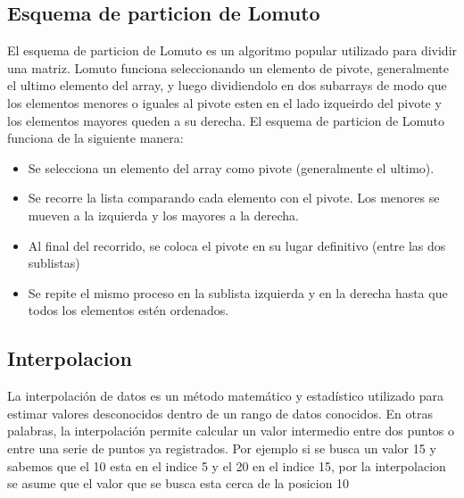 \documentclass[9pt,letterpaper,onecolumn]{rho-class/rho}
\begin{document}
    \subsection{Esquema de particion de Lomuto} \label{ssec:lomuto}
    El esquema de particion de Lomuto es un algoritmo popular utilizado para dividir una matriz. Lomuto funciona seleccionando un elemento
    de pivote, generalmente el ultimo elemento del array, y luego dividiendolo en dos subarrays de modo que los elementos menores o iguales
    al pivote esten en el lado izqueirdo del pivote y los elementos mayores queden a su derecha. El esquema de particion de Lomuto
    funciona de la siguiente manera:
        \begin{itemize}
            \item Se selecciona un elemento del array como pivote (generalmente el ultimo).
            \item Se recorre la lista comparando cada elemento con el pivote. Los menores se mueven a la izquierda y los mayores a la derecha.
            \item Al final del recorrido, se coloca el pivote en su lugar definitivo (entre las dos sublistas)
            \item Se repite el mismo proceso en la sublista izquierda y en la derecha hasta que todos los elementos estén ordenados.
        \end{itemize}

    \subsection{Interpolacion} \label{ssec:interpolacion}
    La interpolación de datos es un método matemático y estadístico utilizado para estimar valores desconocidos dentro de un rango de datos 
    conocidos. En otras palabras, la interpolación permite calcular un valor intermedio entre dos puntos o entre una serie de puntos ya registrados.
    Por ejemplo si se busca un valor 15 y sabemos que el 10 esta en el indice 5 y el 20 en el indice 15, por la interpolacion se 
    asume que el valor que se busca esta cerca de la posicion 10
    
\end{document}
